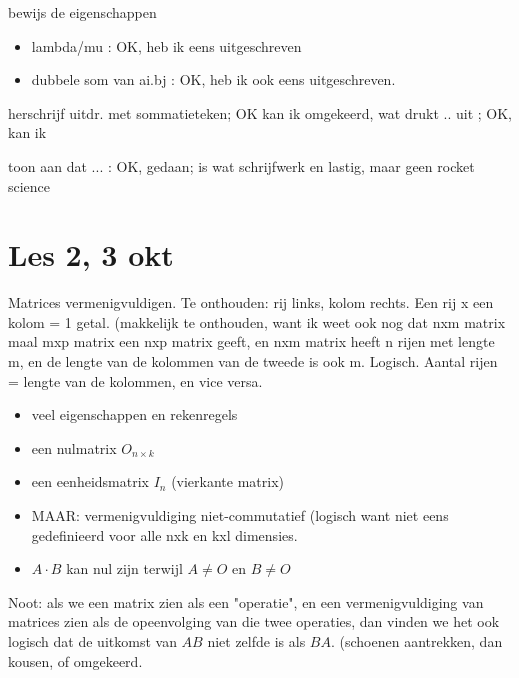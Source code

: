 \documentclass{article}
\begin{document}
bewijs de eigenschappen
\begin{itemize}
\item lambda/mu : OK, heb ik eens uitgeschreven
\item dubbele som van ai.bj : OK, heb ik ook eens uitgeschreven. 
\end{itemize}


herschrijf uitdr. met sommatieteken; OK kan ik 
omgekeerd, wat drukt .. uit  ; OK, kan ik 

toon aan dat ... : OK, gedaan; is wat schrijfwerk en lastig, maar geen rocket science


\section{Les 2, 3 okt}


Matrices vermenigvuldigen. Te onthouden: rij links, kolom rechts. Een rij x een kolom = 1 getal. 
(makkelijk te onthouden, want ik weet ook nog dat nxm matrix maal mxp matrix een nxp matrix geeft, en nxm matrix heeft n rijen met lengte m, en de lengte van de kolommen van de tweede is ook m. Logisch. Aantal rijen = lengte van de kolommen, en vice versa. 

% 


\begin{itemize}
    \item veel eigenschappen en rekenregels
    \item een nulmatrix $O_{n \times k}$
    \item een eenheidsmatrix $I_n$ (vierkante matrix) 
    \item MAAR: vermenigvuldiging niet-commutatief (logisch want niet eens gedefinieerd voor alle nxk en kxl dimensies. 
    \item $A \cdot B$ kan nul zijn terwijl $A \neq O$ en $B \neq O$
\end{itemize}


Noot: als we een matrix zien als een "operatie", en een vermenigvuldiging van matrices zien als de opeenvolging van die twee operaties, dan vinden we het ook logisch dat de uitkomst van $AB$ niet zelfde is als $BA$. (schoenen aantrekken, dan kousen, of omgekeerd. 
\end{document}
